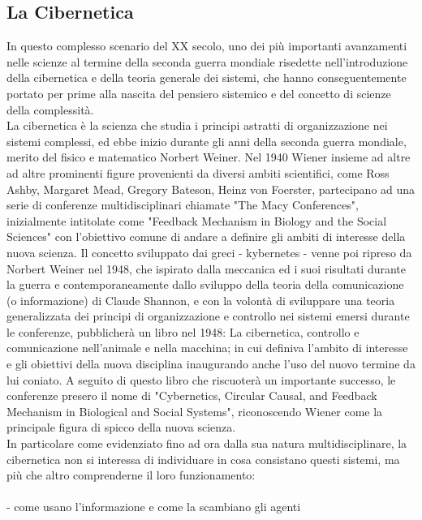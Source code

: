 \subsection{La Cibernetica}
\label{sec:La Cibernetica}
In questo complesso scenario del XX secolo, 
uno dei più importanti avanzamenti nelle scienze
al termine della seconda guerra mondiale risedette nell'introduzione della
cibernetica e della teoria generale dei sistemi, che hanno conseguentemente
portato per prime alla nascita del pensiero sistemico e del concetto
di scienze della complessità. \\
La cibernetica è la scienza che studia i principi astratti di organizzazione
nei sistemi complessi, ed ebbe inizio durante gli anni della seconda guerra
mondiale, merito del fisico e matematico Norbert Weiner.
Nel 1940 Wiener insieme ad altre ad altre prominenti figure provenienti
da diversi ambiti scientifici,
come Ross Ashby, Margaret Mead, Gregory Bateson, Heinz von Foerster,
partecipano ad una serie di conferenze
multidisciplinari chiamate "The Macy Conferences", inizialmente intitolate come
"Feedback Mechanism in Biology and the Social Sciences"
con l'obiettivo comune di andare a definire
gli ambiti di interesse della nuova scienza.
Il concetto sviluppato dai greci - kybernetes -
venne poi ripreso da Norbert Weiner nel 1948,
che ispirato dalla meccanica ed i suoi risultati durante la guerra
e contemporaneamente dallo sviluppo della teoria della comunicazione
(o informazione) di Claude Shannon,
e con la volontà di sviluppare una teoria generalizzata dei principi di
organizzazione e controllo nei sistemi emersi durante le conferenze,
pubblicherà un libro nel 1948:
La cibernetica, controllo e comunicazione nell'animale e nella macchina;
in cui definiva l'ambito di interesse e gli obiettivi della nuova disciplina
inaugurando anche l'uso del nuovo termine da lui coniato.
A seguito di questo libro che riscuoterà
un importante successo, le conferenze presero il nome di
"Cybernetics, Circular Causal, and Feedback Mechanism in Biological and Social Systems",
riconoscendo Wiener come la principale figura di spicco della nuova scienza. \\
In particolare come evidenziato fino ad ora dalla sua natura multidisciplinare,
la cibernetica non si interessa di individuare in cosa consistano questi sistemi,
ma più che altro comprenderne il loro funzionamento:
\\ \\
- come usano l'informazione e come la scambiano gli agenti
\\
